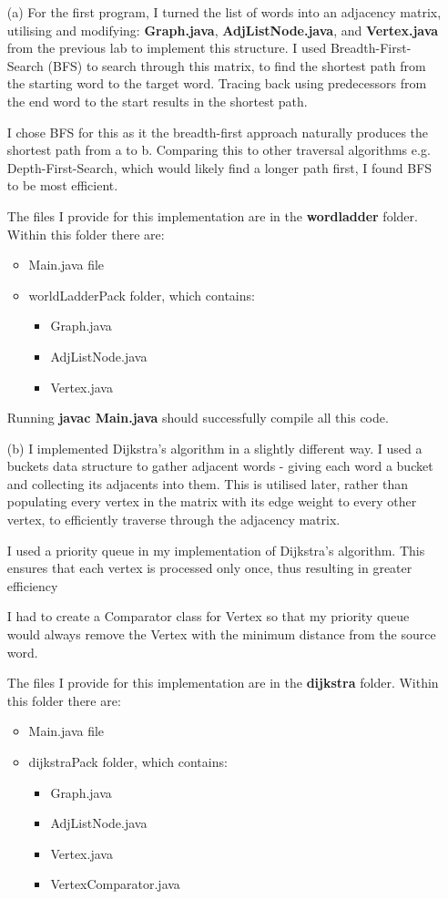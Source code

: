 \documentclass[11pt]{article}
\begin{document}
\begin{itemize}
\item[(a)]
For the first program, I turned the list of words into an adjacency matrix, utilising and modifying: \textbf{Graph.java}, \textbf{AdjListNode.java}, and \textbf{Vertex.java} from the previous lab to implement this structure. I used Breadth-First-Search (BFS) to search through this matrix, to find the shortest path from the starting word to the target word. Tracing back using predecessors from the end word to the start results in the shortest path.

I chose BFS for this as it the breadth-first approach naturally produces the shortest path from a to b. Comparing this to other traversal algorithms e.g. Depth-First-Search, which would likely find a longer path first, I found BFS to be most efficient.

The files I provide for this implementation are in the \textbf{wordladder} folder. Within this folder there are:
\begin{itemize}
  \item Main.java file
  \item worldLadderPack folder, which contains:
  \begin{itemize}
  \item Graph.java
  \item AdjListNode.java
  \item Vertex.java
  \end{itemize}
\end{itemize}
Running \textbf{javac Main.java} should successfully compile all this code.
\item[(b)]
I implemented Dijkstra's algorithm in a slightly different way. I used a buckets data structure to gather adjacent words - giving each word a bucket and collecting its adjacents into them. This is utilised later, rather than populating every vertex in the matrix with its edge weight to every other vertex, to efficiently traverse through the adjacency matrix.

I used a priority queue in my implementation of Dijkstra's algorithm. This ensures that each vertex is processed only once, thus resulting in greater efficiency

I had to create a Comparator class for Vertex so that my priority queue would always remove the Vertex with the minimum distance from the source word.

The files I provide for this implementation are in the \textbf{dijkstra} folder. Within this folder there are:
\begin{itemize}
  \item Main.java file
  \item dijkstraPack folder, which contains:
  \begin{itemize}
  \item Graph.java
  \item AdjListNode.java
  \item Vertex.java
  \item VertexComparator.java
  \end{itemize}
\end{itemize}


\end{itemize}
\end{document}
